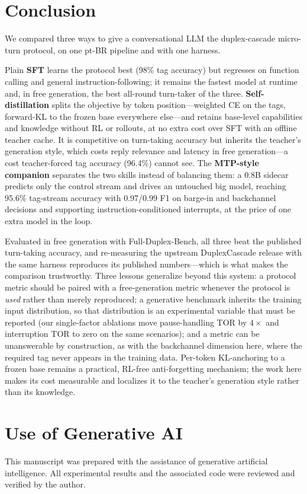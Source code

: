 \documentclass[conference]{IEEEtran}
\begin{document}
\section{Conclusion}
We compared three ways to give a conversational LLM the duplex-cascade micro-turn
protocol, on one pt-BR pipeline and with one harness.

Plain \textbf{SFT} learns the protocol best (98\% tag accuracy) but regresses on
function calling and general instruction-following; it remains the fastest model at
runtime and, in free generation, the best all-round turn-taker of the three.
\textbf{Self-distillation} splits the objective by token position---weighted CE on
the tags, forward-KL to the frozen base everywhere else---and retains base-level
capabilities and knowledge without RL or rollouts, at no extra cost over SFT with
an offline teacher cache. It is competitive on turn-taking accuracy but inherits
the teacher's generation style, which costs reply relevance and latency in free
generation---a cost teacher-forced tag accuracy (96.4\%) cannot see. The
\textbf{MTP-style companion} separates the two skills instead of balancing them: a
0.8B sidecar predicts only the control stream and drives an untouched big model,
reaching 95.6\% tag-stream accuracy with 0.97/0.99 F1 on barge-in and backchannel
decisions and supporting instruction-conditioned interrupts, at the price of one
extra model in the loop.

Evaluated in free generation with Full-Duplex-Bench, all three beat the published
turn-taking accuracy, and re-measuring the upstream DuplexCascade release with the
same harness reproduces its published numbers---which is what makes the comparison
trustworthy. Three lessons generalize beyond this system: a protocol metric should
be paired with a free-generation metric whenever the protocol is \emph{used} rather
than merely reproduced; a generative benchmark inherits the training input
distribution, so that distribution is an experimental variable that must be
reported (our single-factor ablations move pause-handling TOR by $4\times$ and
interruption TOR to zero on the same scenarios); and a metric can be unanswerable by
construction, as with the backchannel dimension here, where the required tag never
appears in the training data. Per-token KL-anchoring to a frozen base remains a practical, RL-free
anti-forgetting mechanism; the work here makes its cost measurable and localizes
it to the teacher's generation style rather than its knowledge.

\section*{Use of Generative AI}
This manuscript was prepared with the assistance of generative artificial
intelligence. All experimental results and the associated code were reviewed and
verified by the author.
\end{document}
